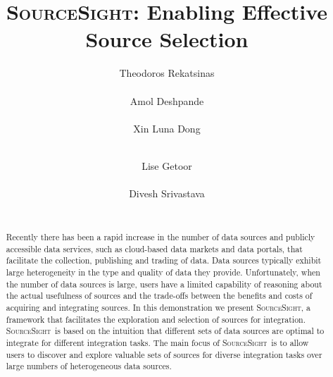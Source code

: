 \documentclass{vldb}
\newcommand\system{\textsc{SourceSight}}
\begin{document}

\title{{\LARGE \system}: Enabling Effective Source Selection}


\author{
\alignauthor
Theodoros Rekatsinas\\
       \\
\alignauthor
Amol Deshpande\\
       \\
\alignauthor 
Xin Luna Dong\\
       \\
\and  %
\alignauthor 
Lise Getoor\\
       \\
\alignauthor Divesh Srivastava\\
       \\
}

\maketitle

\begin{abstract}
Recently there has been a rapid increase in the number of data sources and publicly accessible data services, such as cloud-based data markets and data portals, that facilitate the collection, publishing and trading of data. Data sources typically exhibit large heterogeneity in the type and quality of data they provide. Unfortunately, when the number of data sources is large, users have a limited capability of reasoning about the actual usefulness of sources and the trade-offs between the benefits and costs of acquiring and integrating sources. In this demonstration we present \system, a framework that facilitates the exploration and selection of sources for integration. \system~is based on the intuition that different sets of data sources are optimal to integrate for different integration tasks. The main focus of \system~is to allow users to discover and explore valuable sets of sources for diverse integration tasks over large numbers of heterogeneous data sources.
\end{abstract}
\end{document}
